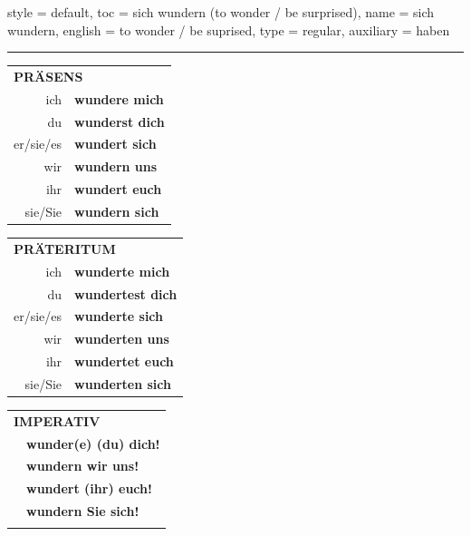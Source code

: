 \begin{verbentry}{
  style = {default},
  toc = {sich wundern (to wonder / be surprised)},
  name = {sich wundern},
  english = {to wonder / be suprised},
  type = {regular},
  auxiliary = {haben}
}
 
    
       \vspace{5pt}

    \hrule
    
    \vspace{5pt}

  \begin{tabular}{rl}
     \multicolumn{2}{l}{\textbf{PRÄSENS} }\\
    ich & \textbf{wundere mich}\\
    du & \textbf{wunderst dich}\\
    er/sie/es & \textbf{wundert sich}\\
    wir & \textbf{wundern uns}\\
    ihr & \textbf{wundert euch}\\
    sie/Sie & \textbf{wundern sich}\\
  \end{tabular}
  \hfill
     \begin{tabular}{rl}
    \multicolumn{2}{l}{\textbf{PRÄTERITUM} }\\
    ich & \textbf{wunderte mich}\\
    du & \textbf{wundertest dich}\\
    er/sie/es & \textbf{wunderte sich}\\
    wir & \textbf{wunderten uns}\\
    ihr & \textbf{wundertet euch}\\
    sie/Sie & \textbf{wunderten sich}\\
  \end{tabular}
  \hfill
  \begin{tabular}{rl}
     \multicolumn{2}{l}{\textbf{IMPERATIV} }\\
   & \textbf{wunder(e) (du) dich!}\\
   & \textbf{wundern wir uns!}\\
   & \textbf{wundert (ihr) euch!}\\
   & \textbf{wundern Sie sich!}\\
   & \vspace{10pt}
  \end{tabular}

    \vspace{10pt}


\end{verbentry}
